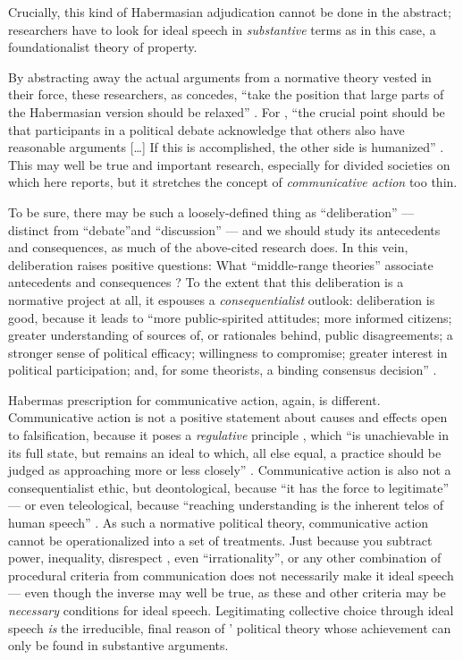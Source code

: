 Crucially, this kind of Habermasian adjudication cannot be done in the abstract; researchers have to look for ideal speech in \emph{substantive} terms as in this case, a foundationalist theory of property.

By abstracting away the actual arguments from a normative theory vested in their force, these researchers, as \citeauthor{Steiner2012} concedes, ``take the position that large parts of the Habermasian version should be relaxed'' \citep[150]{Steiner2012}.
For \citeauthor{Steiner2012}, ``the crucial point should be that participants in a political debate acknowledge that others also have reasonable arguments 
[\ldots]
If this is accomplished, the other side is humanized'' \citeyearpar[150]{Steiner2012}.
This may well be true and important research, especially for divided societies on which \citeauthor{Steiner2012} here reports, but it stretches the concept of \emph{communicative action} too thin.

To be sure, there may be such a loosely-defined thing as ``deliberation'' --- distinct from ``debate''and ``discussion''  \citep[384]{Landwehr2010} --- and we should study its antecedents and consequences, as much of the above-cited research does.
In this vein, deliberation raises positive questions: What ``middle-range theories'' associate antecedents and consequences \citep{Mutz2008}? 
To the extent that this deliberation is a normative project at all, it espouses a \emph{consequentialist} outlook: deliberation is good, because it leads to ``more public-spirited attitudes; more informed citizens; greater understanding of sources of, or rationales behind, public disagreements; a stronger sense of political efficacy; willingness to compromise; greater interest in political participation; and, for some theorists, a binding consensus decision'' \citep[524]{Mutz2008}.

Habermas prescription for communicative action, again, is different.
Communicative action is not a positive statement about causes and effects open to falsification, because it poses a \emph{regulative} principle \citep{Kant1781}, which ``is unachievable in its full state, but remains an ideal to which, all else equal, a practice should be judged as approaching more or less closely'' \cite[80]{Mansbridge2010a}.
Communicative action is also not a consequentialist ethic, but deontological, because ``it has the force to legitimate'' \citep[147]{Habermas2008} --- or even teleological, because ``reaching understanding is the inherent telos of human speech'' \cite[287]{Habermas-1984}.
As such a normative political theory, communicative action cannot be operationalized into a set of treatments.
Just because you subtract power, inequality, disrespect \citep{Steenbergen2003}, even ``irrationality'', or any other combination of procedural criteria from communication  does not necessarily make it ideal speech --- even though the inverse may well be true, as these and other criteria may be \emph{necessary} conditions for ideal speech.
Legitimating collective choice through ideal speech \emph{is} the irreducible, final reason of \citeauthor{Habermas-1984}' political theory whose achievement can only be found in substantive arguments.

